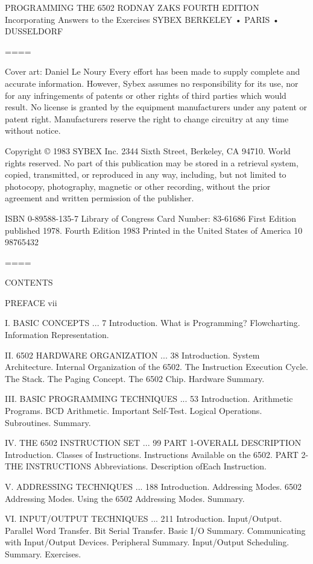 PROGRAMMING
THE 6502
RODNAY ZAKS
FOURTH EDITION
Incorporating Answers to the Exercises
SYBEX
BERKELEY • PARIS • DUSSELDORF

====

Cover art: Daniel Le Noury
Every effort has been made to supply complete and accurate information. However, Sybex assumes no responsibility for its use, nor for any infringements of patents or other rights of third parties which would result. No license is granted by the equipment manufacturers under any patent or patent right. Manufacturers reserve the right to change circuitry at any time without notice.

Copyright © 1983 SYBEX Inc. 2344 Sixth Street, Berkeley, CA 94710. World rights reserved. No part of this publication may be stored in a retrieval system, copied, transmitted, or reproduced in any way, including, but not limited to photocopy, photography, magnetic or other recording, without the prior agreement and written permission of the publisher.

ISBN 0-89588-135-7
Library of Congress Card Number: 83-61686
First Edition published 1978. Fourth Edition 1983
Printed in the United States of America
10 98765432

====

CONTENTS

PREFACE vii

I. BASIC CONCEPTS ... 7
Introduction. What is Programming? Flowcharting. Information Representation.

II. 6502 HARDWARE ORGANIZATION ... 38
Introduction. System Architecture. Internal Organization of the 6502. The Instruction Execution Cycle. The Stack. The Paging Concept. The 6502 Chip. Hardware Summary.

III. BASIC PROGRAMMING TECHNIQUES ... 53
Introduction. Arithmetic Programs. BCD Arithmetic. Important Self-Test. Logical Operations. Subroutines. Summary.

IV. THE 6502 INSTRUCTION SET ... 99
PART 1-OVERALL DESCRIPTION
Introduction. Classes of Instructions. Instructions Available on the 6502.
PART 2-THE INSTRUCTIONS
Abbreviations. Description ofEach Instruction.

V. ADDRESSING TECHNIQUES ... 188
Introduction. Addressing Modes. 6502 Addressing Modes. Using the 6502 Addressing Modes. Summary.

VI. INPUT/OUTPUT TECHNIQUES ... 211
Introduction. Input/Output. Parallel Word Transfer. Bit Serial Transfer. Basic I/O Summary. Communicating with Input/Output Devices. Peripheral Summary. Input/Output Scheduling. Summary. Exercises.

